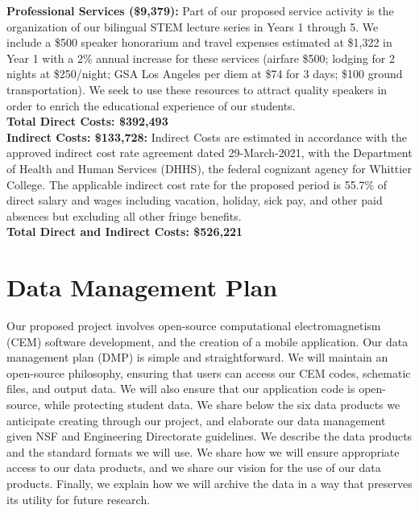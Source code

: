 \documentclass[11pt]{amsart}
\begin{document}
\noindent
\textbf{Professional Services (\$9,379):} Part of our proposed service activity is the organization of our bilingual STEM lecture series in Years 1 through 5. We include a \$500 speaker honorarium and travel expenses estimated at \$1,322 in Year 1 with a 2\% annual increase for these services (airfare \$500; lodging for 2 nights at \$250/night; GSA Los Angeles per diem at \$74 for 3 days; \$100 ground transportation). We seek to use these resources to attract quality speakers in order to enrich the educational experience of our students. \\

\noindent
\textbf{Total Direct Costs: \$392,493} \\

\noindent
\textbf{Indirect Costs: \$133,728:} Indirect Costs are estimated in accordance with the approved indirect cost rate agreement dated 29-March-2021, with the Department of Health and Human Services (DHHS), the federal cognizant agency for Whittier College. The applicable indirect cost rate for the proposed period is 55.7\% of direct salary and wages including vacation, holiday, sick pay, and other paid absences but excluding all other fringe benefits. \\

\noindent
\textbf{Total Direct and Indirect Costs: \$526,221}

\clearpage

\section{Data Management Plan}

Our proposed project involves open-source computational electromagnetism (CEM) software development, and the creation of a mobile application.  Our data management plan (DMP) is simple and straightforward.  We will maintain an open-source philosophy, ensuring that users can access our CEM codes, schematic files, and output data.  We will also ensure that our application code is open-source, while protecting student data.  We share below the six data products we anticipate creating through our project, and elaborate our data management given NSF and Engineering Directorate guidelines.  We describe the data products and the standard formats we will use.  We share how we will ensure appropriate access to our data products, and we share our vision for the use of our data products.  Finally, we explain how we will archive the data in a way that preserves its utility for future research. 
\end{document}
